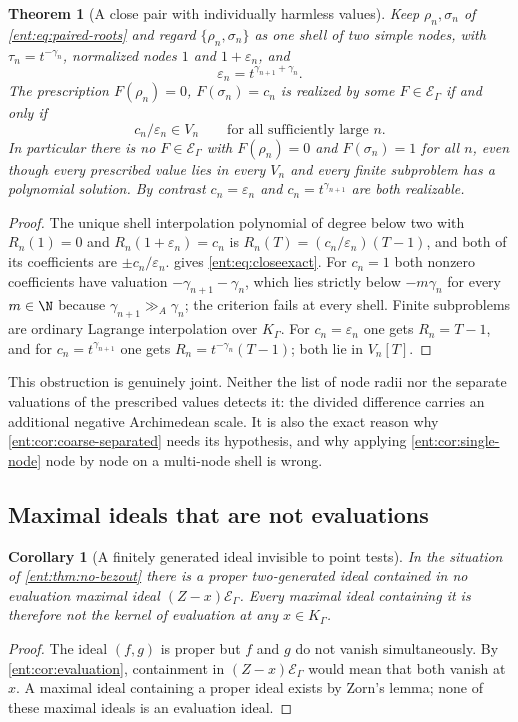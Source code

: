 \documentclass[11pt]{article}
\newtheorem{theorem}{Theorem}[section]
\theoremstyle{plain}
\theoremstyle{plain}
\theoremstyle{plain}
\newtheorem{corollary}[corollary]{Corollary}
\theoremstyle{definition}
\theoremstyle{definition}
\theoremstyle{definition}
\theoremstyle{definition}
\theoremstyle{remark}
\newcommand{\K}{K_\Gamma}\newcommand{\KD}{K_\Delta}
\newcommand{\E}{\mathcal E_\Gamma}
\newcommand{\ggA}{\mathrel{\gg_{\!A}}}
\begin{document}
\begin{theorem}[A close pair with individually harmless values]
\label{ent:thm:close-pair}
Keep $\rho_n,\sigma_n$ of \eqref{ent:eq:paired-roots} and regard
$\{\rho_n,\sigma_n\}$ as one shell of two simple nodes, with
$\tau_n=t^{-\gamma_n}$, normalized nodes $1$ and $1+\varepsilon_n$, and
\[
 \varepsilon_n=t^{\gamma_{n+1}+\gamma_n}.
\]
The prescription $F(\rho_n)=0$, $F(\sigma_n)=c_n$ is realized by some
$F\in\E$ if and only if
\begin{equation}\label{ent:eq:closeexact}
 c_n/\varepsilon_n\in V_n\qquad\text{for all sufficiently large }n .
\end{equation}
In particular there is \emph{no} $F\in\E$ with $F(\rho_n)=0$ and
$F(\sigma_n)=1$ for all $n$, even though every prescribed value lies in every
$V_n$ and every finite subproblem has a polynomial solution. By contrast
$c_n=\varepsilon_n$ and $c_n=t^{\gamma_{n+1}}$ are both realizable.
\end{theorem}
\begin{proof}
The unique shell interpolation polynomial of degree below two with
$R_n(1)=0$ and $R_n(1+\varepsilon_n)=c_n$ is
$R_n(T)=(c_n/\varepsilon_n)(T-1)$, and both of its coefficients are
$\pm c_n/\varepsilon_n$.  gives
\eqref{ent:eq:closeexact}. For $c_n=1$ both nonzero coefficients have
valuation $-\gamma_{n+1}-\gamma_n$, which lies strictly below $-m\gamma_n$
for every $m\in\N$ because $\gamma_{n+1}\ggA\gamma_n$; the criterion fails at
every shell. Finite subproblems are ordinary Lagrange interpolation over
$\K$. For $c_n=\varepsilon_n$ one gets $R_n=T-1$, and for
$c_n=t^{\gamma_{n+1}}$ one gets $R_n=t^{-\gamma_n}(T-1)$; both lie in
$V_n[T]$.
\end{proof}

This obstruction is genuinely joint. Neither the list of node radii nor the
separate valuations of the prescribed values detects it: the divided
difference carries an additional negative Archimedean scale. It is also the
exact reason why \cref{ent:cor:coarse-separated} needs its hypothesis, and
why applying \cref{ent:cor:single-node} node by node on a multi-node shell is
wrong.

\subsection{Maximal ideals that are not evaluations}
\label{ent:subsec:invisible}

\begin{corollary}[A finitely generated ideal invisible to point tests]
\label{ent:cor:invisible-ideal}
In the situation of \cref{ent:thm:no-bezout} there is a proper two-generated
ideal contained in no evaluation maximal ideal $(Z-x)\E$. Every maximal ideal
containing it is therefore not the kernel of evaluation at any $x\in\K$.
\end{corollary}
\begin{proof}
The ideal $(f,g)$ is proper but $f$ and $g$ do not vanish simultaneously. By
\cref{ent:cor:evaluation}, containment in $(Z-x)\E$ would mean that both
vanish at $x$. A maximal ideal containing a proper ideal exists by Zorn's
lemma; none of these maximal ideals is an evaluation ideal.
\end{proof}
\end{document}
